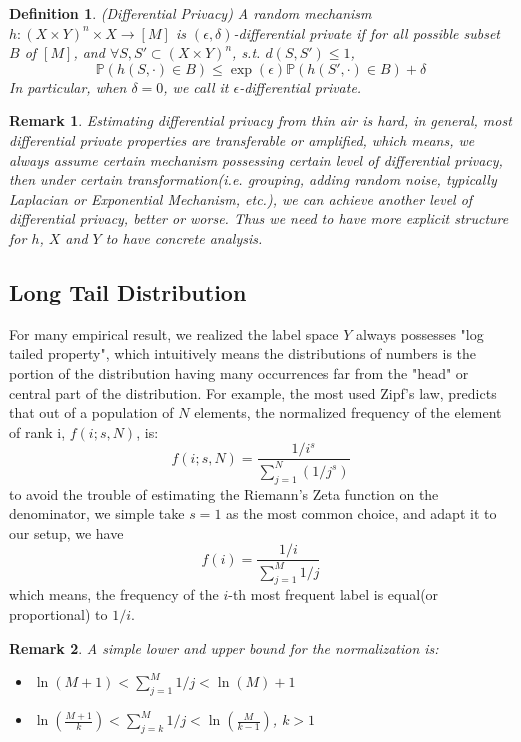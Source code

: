 \documentclass[12pt]{article}
\numberwithin{theorem}{section} %
\newtheorem{definition}{Definition}
\numberwithin{definition}{section} %
\numberwithin{assumption}{section} %
\numberwithin{lemma}{section} %
\newtheorem{remark}{Remark}
\numberwithin{remark}{section} %
\numberwithin{prop}{section} %
\numberwithin{corollary}{section} %
\numberwithin{example}{section} %
\numberwithin{question}{section} %
\numberwithin{problem}{section} %
\numberwithin{conjecture}{section} %
\numberwithin{append}{section} %
\numberwithin{property}{section} %
\def\P{{\mathbb P}}     %
\begin{document}
	\begin{definition}(Differential Privacy)
		A random mechanism $h: (X\times Y)^n\times X \to [M]$ is $(\epsilon,\delta)$-differential private if for all  possible subset $B$ of $[M]$, and $\forall S,S'\subset (X\times Y)^n$, s.t. $d(S,S')\le 1$,
		\begin{equation}
			\P (h(S,\cdot)\in B)\le \exp(\epsilon) \P (h(S',\cdot)\in B)+\delta
		\end{equation}
	In particular, when $\delta=0$, we call it $\epsilon$-differential private.
	\end{definition} 

	\begin{remark}
		Estimating differential privacy from thin air is hard, in general, most differential private properties are transferable or amplified, which means, we always assume certain mechanism possessing certain level of differential privacy, then under certain transformation(i.e. grouping, adding random noise, typically Laplacian or Exponential Mechanism, etc.), we can achieve another level of differential privacy, better or worse. Thus we need to have more explicit structure for $h$, $X$ and $Y$ to have concrete analysis.
	\end{remark}
	
	\subsection{Long Tail Distribution} 
	For many empirical result, we realized the label space $Y$ always possesses "log tailed property", which intuitively means the  distributions of numbers is the portion of the distribution having many occurrences far from the "head" or central part of the distribution. For example, the most used Zipf's law, predicts that out of a population of $N$ elements, the normalized frequency of the element of rank i, $f(i;s,N)$, is:
	\begin{equation}
		f(i;s,N) = \frac{1/i^s}{\sum\limits_{j=1}^N (1/j^s)}
	\end{equation}
to avoid the trouble of estimating the Riemann's Zeta function on the denominator, we simple take $s=1$ as the most common choice, and adapt it to our setup, we have
\begin{equation}
	f(i)=\frac{1/i}{\sum\limits_{j=1}^M 1/j}
\end{equation}
which means, the frequency of the $i$-th most frequent label is equal(or proportional) to $1/i$.
\begin{remark}
	A simple lower and upper bound for the normalization is:
	\begin{itemize}
		\item $\ln (M+1)<\sum\limits_{j=1}^M 1/j< \ln (M)+1$
		\item $\ln (\frac{M+1}{k})<\sum\limits_{j=k}^M 1/j< \ln (\frac{M}{k-1})$, $k>1$
	\end{itemize} 
\end{remark}
\end{document}
